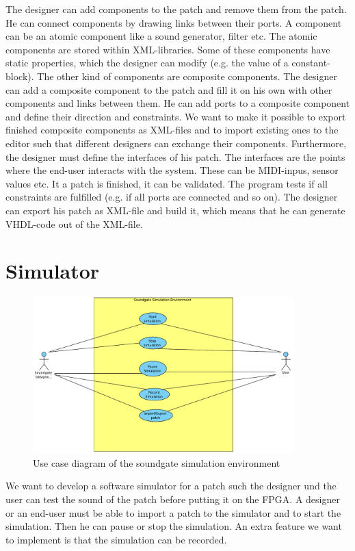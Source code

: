 The designer can add components to the patch and remove them from the patch. He can connect components by drawing links between their ports. A component can be an atomic component like a sound generator, filter etc. The atomic components are stored within XML-libraries. Some of these components have static properties, which the designer can modify (e.g. the value of a constant-block). The other kind of components are composite components. The designer can add a composite component to the patch and fill it on his own with other components and links between them. He can add ports to a composite component and define their direction and constraints. We want to make it possible to export finished composite components as XML-files and to import existing ones to the editor such that different designers can exchange their components.
Furthermore, the designer must define the interfaces of his patch. The interfaces are the points where the end-user interacts with the system. These can be MIDI-inpus, sensor values etc.
It a patch is finished, it can be validated. The program tests if all constraints are fulfilled (e.g. if all ports are connected and so on). The designer can export his patch as XML-file and build it, which means that he can generate VHDL-code out of the XML-file. 

\section{Simulator}

	\begin{figure}[!h]
		\centering
			\includegraphics[width=0.90\textwidth]{images/Soundgate_Simulator.pdf}
		\caption{Use case diagram of the soundgate simulation environment}
		\label{fig:Soundgate_Simulator}
	\end{figure}

We want to develop a software simulator for a patch such the designer und the user can test the sound of the patch before putting it on the FPGA. A designer or an end-user must be able to import a patch to the simulator and to start the simulation. Then he can pause or stop the simulation. An extra feature we want to implement is that the simulation can be recorded.

